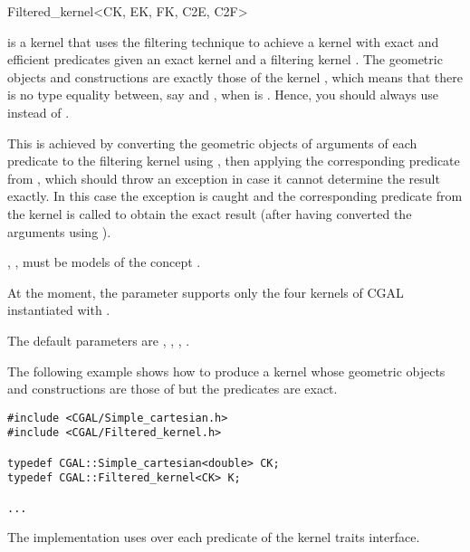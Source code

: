 \begin{ccRefClass}{Filtered_kernel<CK, EK, FK, C2E, C2F>}

\KernelRefLayout\gdef\ccTagOperatorLayout{\ccFalse}

\ccDefinition

\ccClassTemplateName is a kernel that uses the filtering technique
\cite{bbp-iayea-98} to achieve a kernel with exact and efficient
predicates given an exact kernel  and a filtering kernel
.  The geometric objects and constructions are exactly those
of the kernel , which means that there is no type equality
between, say  and , when
 is \ccClassTemplateName. Hence, you should always use
 instead of .

This is achieved by converting the geometric objects of  arguments of
each predicate to the filtering kernel  using , then applying
the corresponding predicate from , which should throw an exception in
case it cannot determine the result exactly.  In this case the exception is
caught and the corresponding predicate from the kernel  is called to
obtain the exact result (after having converted the arguments using
).

, ,  must be models of the concept .

At the moment, the parameter  supports only the four kernels of
CGAL instantiated with .

The default parameters are ,
  ,
  ,
  .



\ccExample

The following example shows how to produce a kernel whose geometric
objects and constructions are those of 
but the predicates are exact.

\begin{verbatim}
#include <CGAL/Simple_cartesian.h>
#include <CGAL/Filtered_kernel.h>

typedef CGAL::Simple_cartesian<double> CK;
typedef CGAL::Filtered_kernel<CK> K;

...
\end{verbatim}

\ccImplementation
The implementation uses  over
each predicate of the kernel traits interface.

\end{ccRefClass}
